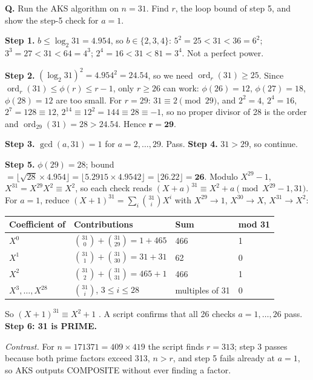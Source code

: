 \begin{worked}[: AKS on $n = 31$]
\textbf{Q.} Run the AKS algorithm on $n = 31$. Find $r$, the loop bound of step 5, and show the step-5 check for $a = 1$.

\textbf{Step 1.} $b \le \log_2 31 = 4.954$, so $b \in \{2, 3, 4\}$: $5^2 = 25 < 31 < 36 = 6^2$; $3^3 = 27 < 31 < 64 = 4^3$; $2^4 = 16 < 31 < 81 = 3^4$. Not a perfect power.

\textbf{Step 2.} $(\log_2 31)^2 = 4.954^2 = 24.54$, so we need $\operatorname{ord}_r(31) \ge 25$. Since $\operatorname{ord}_r(31) \le \phi(r) \le r - 1$, only $r \ge 26$ can work: $\phi(26) = 12$, $\phi(27) = 18$, $\phi(28) = 12$ are too small. For $r = 29$: $31 \equiv 2 \pmod{29}$, and $2^2 = 4$, $2^4 = 16$, $2^7 = 128 \equiv 12$, $2^{14} \equiv 12^2 = 144 \equiv 28 \equiv -1$, so no proper divisor of 28 is the order and $\operatorname{ord}_{29}(31) = 28 > 24.54$. Hence $\mathbf{r = 29}$.

\textbf{Step 3.} $\gcd(a, 31) = 1$ for $a = 2, \dots, 29$. Pass. \quad \textbf{Step 4.} $31 > 29$, so continue.

\textbf{Step 5.} $\phi(29) = 28$; bound $= \lfloor \sqrt{28} \times 4.954 \rfloor = \lfloor 5.2915 \times 4.9542 \rfloor = \lfloor 26.22 \rfloor = \mathbf{26}$. Modulo $X^{29} - 1$, $X^{31} = X^{29} X^2 \equiv X^2$, so each check reads $(X + a)^{31} \equiv X^2 + a \pmod{X^{29} - 1, 31}$. For $a = 1$, reduce $(X + 1)^{31} = \sum_i \binom{31}{i} X^i$ with $X^{29} \to 1$, $X^{30} \to X$, $X^{31} \to X^2$:
\begin{center}\small
\begin{tabular}{@{}llll@{}}
\toprule
Coefficient of & Contributions & Sum & mod 31\\
\midrule
$X^0$ & $\binom{31}{0} + \binom{31}{29} = 1 + 465$ & 466 & 1\\
$X^1$ & $\binom{31}{1} + \binom{31}{30} = 31 + 31$ & 62 & 0\\
$X^2$ & $\binom{31}{2} + \binom{31}{31} = 465 + 1$ & 466 & 1\\
$X^3, \dots, X^{28}$ & $\binom{31}{i}$, $3 \le i \le 28$ & multiples of 31 & 0\\
\bottomrule
\end{tabular}
\end{center}
So $(X + 1)^{31} \equiv X^2 + 1$ \checkmark. A script confirms that all 26 checks $a = 1, \dots, 26$ pass. \textbf{Step 6: 31 is PRIME.}

\emph{Contrast.} For $n = 171371 = 409 \times 419$ the script finds $r = 313$; step 3 passes because both prime factors exceed 313, $n > r$, and step 5 fails already at $a = 1$, so AKS outputs COMPOSITE without ever finding a factor.
\end{worked}

